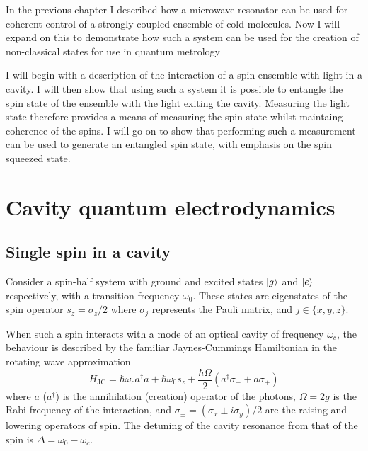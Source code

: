 In the previous chapter I described how a microwave resonator can be used for
coherent control of a strongly-coupled ensemble of cold molecules. Now I will
expand on this to demonstrate how such a system can be used for the creation of
non-classical states for use in quantum metrology 

I will begin with a description of the interaction of a spin ensemble with
light in a cavity. I will then show that using such a system it is possible to
entangle the spin state of the ensemble with the light exiting the cavity.
Measuring the light state therefore provides a means of measuring the spin
state whilst maintaing coherence of the spins. I will go on to show that
performing such a measurement can be used to generate an entangled spin state,
with emphasis on the spin squeezed state.

\section{Cavity quantum electrodynamics}

\subsection{Single spin in a cavity}

Consider a spin-half system with ground and excited states $\ket{g}$
and $\ket{e}$ respectively, with a transition frequency $\omega_0$. These
states are eigenstates of the spin operator $s_z = \sigma_z /2$ where
$\sigma_j$ represents the Pauli matrix, and $j\in \{x,y,z\}$.

When such a spin interacts with a mode of an optical cavity of frequency
$\omega_c$, the behaviour is described by the familiar Jaynes-Cummings
Hamiltonian in the rotating wave approximation~\cite{}
%
\begin{equation}
  H_\text{JC} = \hbar\omega_c a^\dagger a + \hbar \omega_0 s_z +
  \frac{\hbar\Omega}{2}(a^\dagger \sigma_- + a\sigma_+)
  \label{squeeze:eqn:JCH}
\end{equation}
%
where $a$ ($a^\dagger$) is the annihilation (creation) operator of the photons,
$\Omega = 2g$ is the Rabi frequency of the interaction, and $\sigma_\pm =
(\sigma_x \pm i\sigma_y)/2$ are the raising and lowering operators of spin. The
detuning of the cavity resonance from that of the spin is $\Delta = \omega_0 -
\omega_c$.

